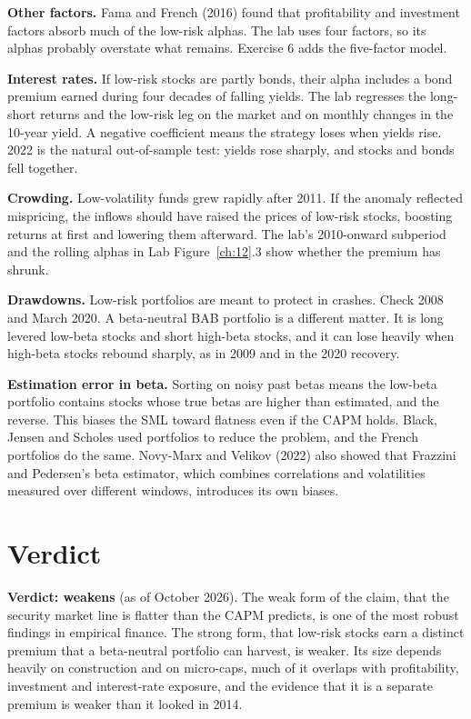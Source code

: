 \textbf{Other factors.} Fama and French (2016) found that profitability and investment factors absorb much of the low-risk alphas. The lab uses four factors, so its alphas probably overstate what remains. Exercise 6 adds the five-factor model.

\textbf{Interest rates.} If low-risk stocks are partly bonds, their alpha includes a bond premium earned during four decades of falling yields. The lab regresses the long-short returns and the low-risk leg on the market and on monthly changes in the 10-year yield. A negative coefficient means the strategy loses when yields rise. 2022 is the natural out-of-sample test: yields rose sharply, and stocks and bonds fell together.

\textbf{Crowding.} Low-volatility funds grew rapidly after 2011. If the anomaly reflected mispricing, the inflows should have raised the prices of low-risk stocks, boosting returns at first and lowering them afterward. The lab's 2010-onward subperiod and the rolling alphas in Lab Figure~\ref{ch:12}.3 show whether the premium has shrunk.

\textbf{Drawdowns.} Low-risk portfolios are meant to protect in crashes. Check 2008 and March 2020. A beta-neutral BAB portfolio is a different matter. It is long levered low-beta stocks and short high-beta stocks, and it can lose heavily when high-beta stocks rebound sharply, as in 2009 and in the 2020 recovery.

\textbf{Estimation error in beta.} Sorting on noisy past betas means the low-beta portfolio contains stocks whose true betas are higher than estimated, and the reverse. This biases the SML toward flatness even if the CAPM holds. Black, Jensen and Scholes used portfolios to reduce the problem, and the French portfolios do the same. Novy-Marx and Velikov (2022) also showed that Frazzini and Pedersen's beta estimator, which combines correlations and volatilities measured over different windows, introduces its own biases.

\section{Verdict}
\label{sec:12-verdict}

\begin{callout}
\textbf{Verdict: weakens} (as of October 2026). The weak form of the claim, that the security market line is flatter than the CAPM predicts, is one of the most robust findings in empirical finance. The strong form, that low-risk stocks earn a distinct premium that a beta-neutral portfolio can harvest, is weaker. Its size depends heavily on construction and on micro-caps, much of it overlaps with profitability, investment and interest-rate exposure, and the evidence that it is a separate premium is weaker than it looked in 2014.
\end{callout}

